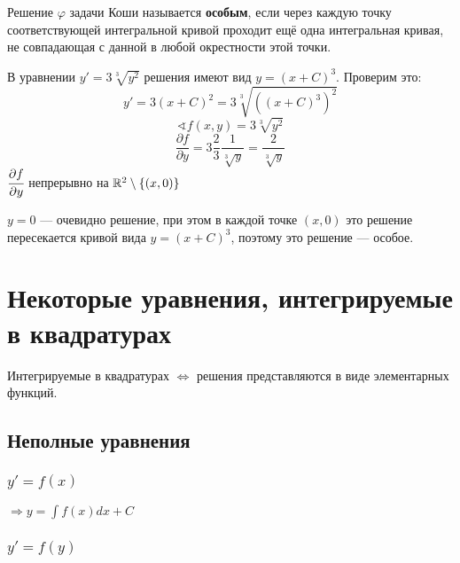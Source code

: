 \begin{definition}
    Решение $\varphi$ задачи Коши называется \textbf{особым}, если через каждую точку соответствующей интегральной кривой проходит ещё одна интегральная кривая, не совпадающая с данной в любой окрестности этой точки.
\end{definition}
\begin{example}
    В уравнении $y'=3\sqrt[3]{y^2}$ решения имеют вид $y=(x+C)^3$. Проверим это:
    $$y'=3(x+C)^2=3\sqrt[3]{((x+C)^3)^2}$$
    $$\sphericalangle f(x, y) = 3\sqrt[3]{y^2}$$
    $$\frac{\partial f}{\partial y} = 3\frac{2}{3}\frac{1}{\sqrt[3] y} = \frac{2}{\sqrt[3] y}$$
    $\cfrac{\partial f}{\partial y}$ непрерывно на $\mathbb{R}^2\setminus\{(x, 0)\}$

    $y=0$ --- очевидно решение, при этом в каждой точке $(x, 0)$ это решение пересекается кривой вида $y=(x+C)^3$, поэтому это решение --- особое.
\end{example}

\section{Некоторые уравнения, интегрируемые в квадратурах}

Интегрируемые в квадратурах $\Leftrightarrow$ решения представляются в виде элементарных функций.

\subsection{Неполные уравнения}

\subsubsection{$y'=f(x)$}

$\Rightarrow y=\int f(x)dx + C$

\subsubsection{$y'=f(y)$}

